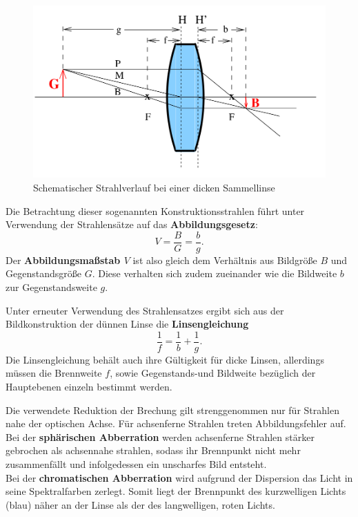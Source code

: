 \begin{figure}
  \includegraphics[width=\linewidth]{Bilder/fettelinse.png}
  \caption{Schematischer Strahlverlauf bei einer dicken Sammellinse \cite{Anleitung}}
  \label{fig:diefette}
\end{figure}
Die Betrachtung dieser sogenannten Konstruktionsstrahlen führt unter Verwendung der Strahlensätze auf das \textbf{Abbildungsgesetz}:
\begin{equation}
  \label{eqn:abbi}
  V=\frac{B}{G}=\frac{b}{g} \text{.}
\end{equation}
Der \textbf{Abbildungsmaßstab $V$} ist also gleich dem Verhältnis aus Bildgröße $B$ und Gegenstandsgröße $G$. Diese verhalten sich zudem zueinander wie die Bildweite $b$ zur Gegenstandsweite $g$.

Unter erneuter Verwendung des Strahlensatzes ergibt sich aus der Bildkonstruktion der dünnen Linse die \textbf{Linsengleichung}
\begin{equation}
  \label{eqn:linsi}
\frac{1}{f}=\frac{1}{b}+\frac{1}{g} \text{.}
\end{equation}
Die Linsengleichung behält auch ihre Gültigkeit für dicke Linsen, allerdings müssen die Brennweite $f$, sowie Gegenstands-und Bildweite bezüglich der Hauptebenen einzeln bestimmt werden.

Die verwendete Reduktion der Brechung gilt strenggenommen nur für Strahlen nahe der optischen Achse. Für achsenferne Strahlen treten Abbildungsfehler auf.
\\Bei der \textbf{sphärischen Abberration} werden achsenferne Strahlen stärker gebrochen als achsennahe strahlen, sodass ihr Brennpunkt nicht mehr zusammenfällt und infolgedessen ein unscharfes Bild entsteht.
\\Bei der \textbf{chromatischen Abberration} wird aufgrund der Dispersion das Licht in seine Spektralfarben zerlegt. Somit liegt der Brennpunkt des kurzwelligen Lichts (blau) näher an der Linse als der des langwelligen, roten Lichts.

